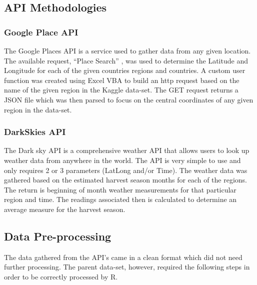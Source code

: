 \documentclass[
  12pt,
  english,
  man]{apa6}
\begin{document}
\hypertarget{api-methodologies}{%
\subsection{API Methodologies}\label{api-methodologies}}

\hypertarget{google-place-api}{%
\subsubsection{Google Place API}\label{google-place-api}}

The Google Places API is a service used to gather data from any given location. The available request, \enquote{Place Search} , was used to determine the Latitude and Longitude for each of the given countries regions and countries. A custom user function was created using Excel VBA to build an http request based on the name of the given region in the Kaggle data-set. The GET request returns a JSON file which was then parsed to focus on the central coordinates of any given region in the data-set.

\hypertarget{darkskies-api}{%
\subsubsection{DarkSkies API}\label{darkskies-api}}

The Dark sky API is a comprehensive weather API that allows users to look up weather data from anywhere in the world. The API is very simple to use and only requires 2 or 3 parameters (Lat\textbar Long and/or Time). The weather data was gathered based on the estimated harvest season months for each of the regions. The return is beginning of month weather measurements for that particular region and time. The readings associated then is calculated to determine an average measure for the harvest season.

\hypertarget{data-pre-processing}{%
\subsection{Data Pre-processing}\label{data-pre-processing}}

The data gathered from the API's came in a clean format which did not need further processing. The parent data-set, however, required the following steps in order to be correctly processed by R.
\end{document}
